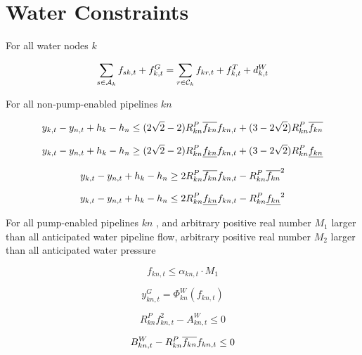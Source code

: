 \section{Water Constraints}

For all water nodes $k$ \atallt{}

\begin{equation}
  \sum_{s \in \mathcal A_k} f_{sk,t} + f^G_{k,t} = \sum_{r \in \mathcal C_k} f_{kr,t} +
  f^T_{k,t} + d^W_{k,t}
\end{equation}

For all non-pump-enabled pipelines $kn$ \atallt{}

\begin{equation}
  y_{k,t} - y_{n,t} + h_k - h_n
  \leq
  (2\sqrt{2} - 2) R^P_{kn} \overline{f_{kn}} f_{kn,t} +
  (3 - 2\sqrt{2}) R^P_{kn} \overline{f_{kn}}
\end{equation}

\begin{equation}
  y_{k,t} - y_{n,t} + h_k - h_n
  \geq
  (2\sqrt{2} - 2) R^P_{kn} \underline{f_{kn}} f_{kn,t} +
  (3 - 2\sqrt{2}) R^P_{kn} \underline{f_{kn}}
\end{equation}

\begin{equation}
  y_{k,t} - y_{n,t} + h_k - h_n
  \geq
  2 R^P_{kn} \overline{f_{kn}} f_{kn,t} - R^P_{kn}\overline{f_{kn}}^2
\end{equation}

\begin{equation}
  y_{k,t} - y_{n,t} + h_k - h_n
  \leq
  2 R^P_{kn} \underline{f_{kn}} f_{kn,t} - R^P_{kn}\underline{f_{kn}}^2
\end{equation}

For all pump-enabled pipelines $kn$ \atallt{}, and arbitrary positive real
number $M_1$ larger than all anticipated water pipeline flow, arbitrary positive
real number $M_2$ larger than all anticipated water pressure

\begin{equation}
  f_{kn,t} \leq \alpha_{kn,t} \cdot M_1
\end{equation}

\begin{equation}
  y^G_{kn,t} = \Phi^W_{kn}(f_{kn,t})
\end{equation}

\begin{equation}
  R^P_{kn} f^2_{kn,t} - A^W_{kn,t} \leq 0
\end{equation}

\begin{equation}
  B^W_{kn,t} - R^P_{kn} \overline{f_{kn}} f_{kn,t} \leq 0
\end{equation}


